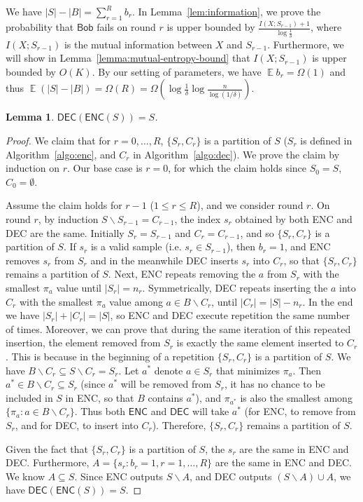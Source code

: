 \documentclass[11pt]{article}
\newtheorem{lemma}{Lemma}
\DeclareMathOperator*{\E}{\mathbb{E}}
\newcommand{\enc}{\textsf{ENC}\xspace}
\newcommand{\dec}{\textsf{DEC}\xspace}
\newcommand{\query}{\mathsf{Bob}}
\begin{document}
We have $|S|-|B|=\sum_{r=1}^{R}b_r$. 
In Lemma~\ref{lem:information}, we prove the probability that $\query$ fails on round $r$ is upper bounded by $\frac{I(X;S_{r-1})+1}{\log \frac{1}{\delta}}$, where $I(X;S_{r-1})$ is the mutual information between $X$ and $S_{r-1}$. 
Furthermore, we will show in Lemma~\ref{lemma:mutual-entropy-bound} that $I(X;S_{r-1})$ is upper bounded by $O(K)$.
By our setting of parameters, we have $\E b_r=\Omega(1)$ and thus $\E(|S|-|B|)=\Omega(R)=\Omega(\log \frac{1}{\delta}\log \frac{n}{\log (1/\delta)})$.
 
\begin{lemma}\label{lemma:zero-fail-prob}
  $\dec(\enc(S))=S$.
\end{lemma}
\begin{proof}
  We claim that for $r=0,\ldots, R$, $\{S_r, C_r\}$ is a partition of $S$ ($S_r$ is defined in Algorithm~\ref{algo:enc}, and $C_r$ in Algorithm~\ref{algo:dec}). We prove the claim by induction on $r$. Our base case is $r=0$, for which the claim holds since $S_0 = S$, $C_0 = \emptyset$.
  
  Assume the claim holds for $r-1$ ($1\le r \le R$), and we consider round $r$.  On round $r$, by induction $S\backslash S_{r-1}=C_{r-1}$, the index $s_r$ obtained by both \enc and \dec are the same.  Initially $S_r=S_{r-1}$ and $C_r=C_{r-1}$, and so $\{S_r,C_r\}$ is a partition of $S$.  If $s_r$ is a valid sample (i.e. $s_r\in S_{r-1}$), then $b_r=1$, and \enc removes $s_r$ from $S_r$ and in the meanwhile \dec inserts $s_r$ into $C_r$, so that $\{S_r, C_r\}$ remains a partition of $S$. Next, \enc repeats removing the $a$ from $S_r$ with the smallest $\pi_a$ value until $|S_r|=n_r$. Symmetrically, \dec repeats inserting the $a$ into $C_r$ with the smallest $\pi_a$ value among $a\in B\backslash C_r$, until $|C_r|=|S|-n_r$. In the end we have $|S_r|+|C_r|=|S|$, so \enc and \dec execute repetition the same number of times.  Moreover, we can prove that during the same iteration of this repeated insertion, the element removed from $S_r$ is exactly the same element inserted to $C_r$.  This is because in the beginning of a repetition $\{S_r, C_r\}$ is a partition of $S$.  We have $B\backslash C_r\subseteq S\backslash C_r=S_r$. Let $a^*$ denote $a\in S_r$ that minimizes $\pi_a$.  Then $a^*\in B\backslash C_r\subseteq S_r$ (since $a^*$ will be removed from $S_r$, it has no chance to be included in $S$ in \enc, so that $B$ contains $a^*$), and $\pi_{a^*}$ is also the smallest among $\{\pi_a : a\in B\backslash C_r\}$.  Thus both $\enc$ and $\dec$ will take $a^{*}$ (for \enc, to remove from $S_r$, and for \dec, to insert into $C_r$).  Therefore, $\{S_r, C_r\}$ remains a partition of $S$.
  
  Given the fact that $\{S_r, C_r\}$ is a partition of $S$, the $s_r$ are the same in \enc and \dec.  Furthermore, $A=\{s_r : b_r=1,r=1,\ldots, R\}$ are the same in \enc and \dec.  We know $A\subseteq S$.  Since \enc outputs $S\backslash A$, and \dec outputs $(S\backslash A)\cup A$, we have $\dec(\enc(S))=S$.
\end{proof}
\end{document}
